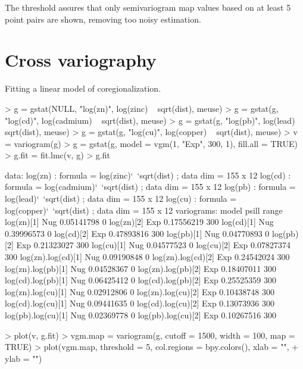 \documentclass[a4paper]{article}
\begin{document}
The threshold assures that only semivariogram map values based on at
least 5 point pairs are shown, removing too noisy estimation.


\section{Cross variography}

Fitting a linear model of coregionalization.

\begin{Schunk}
\begin{Sinput}
> g = gstat(NULL, "log(zn)", log(zinc) ~ sqrt(dist), meuse)
> g = gstat(g, "log(cd)", log(cadmium) ~ sqrt(dist), meuse)
> g = gstat(g, "log(pb)", log(lead) ~ sqrt(dist), meuse)
> g = gstat(g, "log(cu)", log(copper) ~ sqrt(dist), meuse)
> v = variogram(g)
> g = gstat(g, model = vgm(1, "Exp", 300, 1), fill.all = TRUE)
> g.fit = fit.lmc(v, g)
> g.fit
\end{Sinput}
\begin{Soutput}
data:
log(zn) : formula = log(zinc)`~`sqrt(dist) ; data dim = 155 x 12
log(cd) : formula = log(cadmium)`~`sqrt(dist) ; data dim = 155 x 12
log(pb) : formula = log(lead)`~`sqrt(dist) ; data dim = 155 x 12
log(cu) : formula = log(copper)`~`sqrt(dist) ; data dim = 155 x 12
variograms:
                   model      psill range
log(zn)[1]           Nug 0.05141798     0
log(zn)[2]           Exp 0.17556219   300
log(cd)[1]           Nug 0.39996573     0
log(cd)[2]           Exp 0.47893816   300
log(pb)[1]           Nug 0.04770893     0
log(pb)[2]           Exp 0.21323027   300
log(cu)[1]           Nug 0.04577523     0
log(cu)[2]           Exp 0.07827374   300
log(zn).log(cd)[1]   Nug 0.09190848     0
log(zn).log(cd)[2]   Exp 0.24542024   300
log(zn).log(pb)[1]   Nug 0.04528367     0
log(zn).log(pb)[2]   Exp 0.18407011   300
log(cd).log(pb)[1]   Nug 0.06425412     0
log(cd).log(pb)[2]   Exp 0.25525359   300
log(zn).log(cu)[1]   Nug 0.02912806     0
log(zn).log(cu)[2]   Exp 0.10438748   300
log(cd).log(cu)[1]   Nug 0.09441635     0
log(cd).log(cu)[2]   Exp 0.13073936   300
log(pb).log(cu)[1]   Nug 0.02369778     0
log(pb).log(cu)[2]   Exp 0.10267516   300
\end{Soutput}
\begin{Sinput}
> plot(v, g.fit)
> vgm.map = variogram(g, cutoff = 1500, width = 100, map = TRUE)
> plot(vgm.map, threshold = 5, col.regions = bpy.colors(), xlab = "", 
+     ylab = "")
\end{Sinput}
\end{Schunk}
\end{document}
